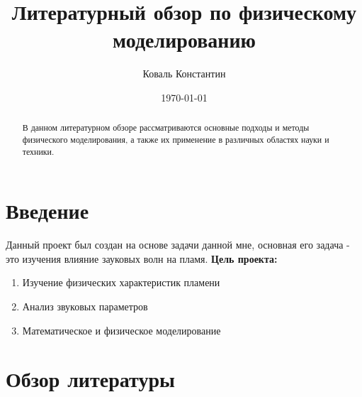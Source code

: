 \documentclass[a4paper,12pt]{article}
\title{Литературный обзор по физическому моделированию}
\author{Коваль Константин}
\date{\today}
\begin{document}
\maketitle

\begin{abstract}
    В данном литературном обзоре рассматриваются основные подходы и методы физического моделирования, а также их применение в различных областях науки и техники.
\end{abstract}

\section{Введение}
Данный проект был создан на основе задачи данной мне, основная его задача - это изучения влияние зауковых волн на пламя.
\newline
\textbf{Цель проекта:}\begin{enumerate}
    \item Изучение физических характеристик пламени
    \item Анализ звуковых параметров
    \item Математическое и физическое моделирование
\end{enumerate}
\newpage
\section{Обзор литературы}
\end{document}
